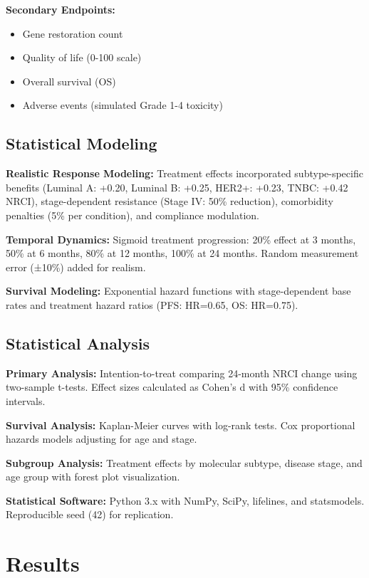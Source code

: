 \documentclass[12pt,a4paper]{article}
\begin{document}
\textbf{Secondary Endpoints:}
\begin{itemize}
\item Gene restoration count
\item Quality of life (0-100 scale)
\item Overall survival (OS)
\item Adverse events (simulated Grade 1-4 toxicity)
\end{itemize}

\subsection{Statistical Modeling}

\textbf{Realistic Response Modeling:} Treatment effects incorporated subtype-specific benefits (Luminal A: +0.20, Luminal B: +0.25, HER2+: +0.23, TNBC: +0.42 NRCI), stage-dependent resistance (Stage IV: 50\% reduction), comorbidity penalties (5\% per condition), and compliance modulation.

\textbf{Temporal Dynamics:} Sigmoid treatment progression: 20\% effect at 3 months, 50\% at 6 months, 80\% at 12 months, 100\% at 24 months. Random measurement error (±10\%) added for realism.

\textbf{Survival Modeling:} Exponential hazard functions with stage-dependent base rates and treatment hazard ratios (PFS: HR=0.65, OS: HR=0.75).

\subsection{Statistical Analysis}

\textbf{Primary Analysis:} Intention-to-treat comparing 24-month NRCI change using two-sample t-tests. Effect sizes calculated as Cohen's d with 95\% confidence intervals.

\textbf{Survival Analysis:} Kaplan-Meier curves with log-rank tests. Cox proportional hazards models adjusting for age and stage.

\textbf{Subgroup Analysis:} Treatment effects by molecular subtype, disease stage, and age group with forest plot visualization.

\textbf{Statistical Software:} Python 3.x with NumPy, SciPy, lifelines, and statsmodels. Reproducible seed (42) for replication.

\section{Results}
\end{document}
